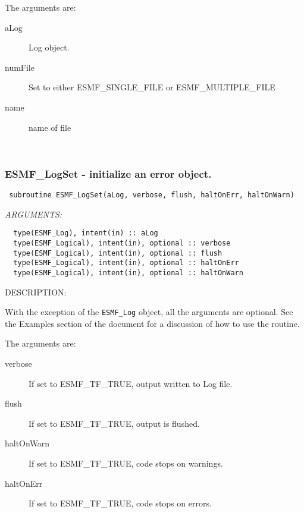    The arguments are:
   \begin{description}
   
   \item[aLog]
   Log object.
  
   \item[numFile]
   Set to either ESMF\_SINGLE\_FILE or ESMF\_MULTIPLE\_FILE
   
    \item[name]
    name of file
   
    \end{description}
    
 
\mbox{}\hrulefill\ 
 
\subsubsection [ESMF\_LogSet] {ESMF\_LogSet - initialize an error object.}


  
\begin{verbatim} subroutine ESMF_LogSet(aLog, verbose, flush, haltOnErr, haltOnWarn)\end{verbatim}{\em ARGUMENTS:}
\begin{verbatim}  type(ESMF_Log), intent(in) :: aLog
  type(ESMF_Logical), intent(in), optional :: verbose
  type(ESMF_Logical), intent(in), optional :: flush
  type(ESMF_Logical), intent(in), optional :: haltOnErr
  type(ESMF_Logical), intent(in), optional :: haltOnWarn \end{verbatim}
{\sf DESCRIPTION:\\ }


  
     With the exception of the {\tt ESMF\_Log} object, all the arguments
     are optional.
     See the Examples section of the document for a discussion of how to use
     the routine.
  
     The arguments are:
     \begin{description}
  
     \item[verbose]
     If set to ESMF\_TF\_TRUE, output written to Log file.                   
    \item[flush]                                                       
     If set to ESMF\_TF\_TRUE, output is flushed.                                  
    \item[haltOnWarn]                                              
     If set to ESMF\_TF\_TRUE, code stops on warnings.                             
    \item[haltOnErr]                                                   
     If set to ESMF\_TF\_TRUE, code stops on errors.                               
  
    \end{description}
   
